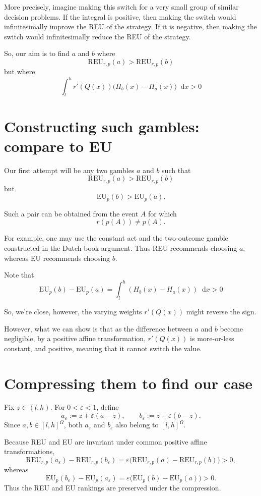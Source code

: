 \documentclass[a4paper,final]{article}
\newcommand\EU{\mathrm{EU}}
\newcommand\REU{\mathrm{REU}}
\newcommand*\diff{\mathop{}\!\mathrm{d}}
\newenvironment{CCM rewritten}
{\begingroup\color{blue}} %
{\endgroup}              %
\begin{document}
More precisely, imagine making this switch for a very small group of
similar decision problems. If the integral is positive, then making the
switch would infinitesimally improve the REU of the strategy. If it is
negative, then making the switch would infinitesimally reduce the REU of
the strategy.

So, our aim is to find $a$ and $b$ where 
\[ \REU_{r,p}(a)>\REU_{r,p}(b) \]
but where 
\[
\int_l^h
r'(Q(x))
\bigl(H_b(x)-H_a(x)\bigr)
\diff x>0
\]

\section{Constructing such gambles: compare to EU}

Our first attempt will be any two gambles  $a$ and $b$ such that \[ \REU_{r,p}(a)>\REU_{r,p}(b) \] but \[ \EU_p(b)>\EU_p(a). \] 

Such a pair can be obtained from the event $A$ for which \[ r(p(A))\neq p(A). \] 

For example, one may use the constant act and the two-outcome gamble constructed in the Dutch-book argument. Thus REU recommends choosing $a$, whereas EU recommends choosing $b$.

Note that  \begin{equation}\label{eq:1}
\EU_p(b)-\EU_p(a)=\int_l^h (H_b(x)-H_a(x) )\diff x>0
\end{equation}

So, we're close, however, the varying weights $r'(Q(x))$ might reverse the sign.

However, what we can show is that as the difference between $a$ and $b$ become negligible, by a positive affine transformation, $r'(Q(x))$ is more-or-less constant, and positive, meaning that it cannot switch the value. 

\section{Compressing them to find our case}

Fix \(z\in(l,h)\). For \(0<\varepsilon<1\), define
\[
a_\varepsilon
:=
z+\varepsilon(a-z),
\qquad
b_\varepsilon
:=
z+\varepsilon(b-z).
\]
Since \(a,b\in[l,h]^\Omega\), both \(a_\varepsilon\) and
\(b_\varepsilon\) also belong to \([l,h]^\Omega\).

Because REU and EU are invariant under common positive affine
transformations,
\[
\REU_{r,p}(a_\varepsilon)-\REU_{r,p}(b_\varepsilon)
=
\varepsilon
\bigl(
\REU_{r,p}(a)-\REU_{r,p}(b)
\bigr)
>0,
\]
whereas
\[
\EU_p(b_\varepsilon)-\EU_p(a_\varepsilon)
=
\varepsilon
\bigl(
\EU_p(b)-\EU_p(a)
\bigr)
>0.
\]
Thus the REU and EU rankings are preserved under the compression.
\end{document}
